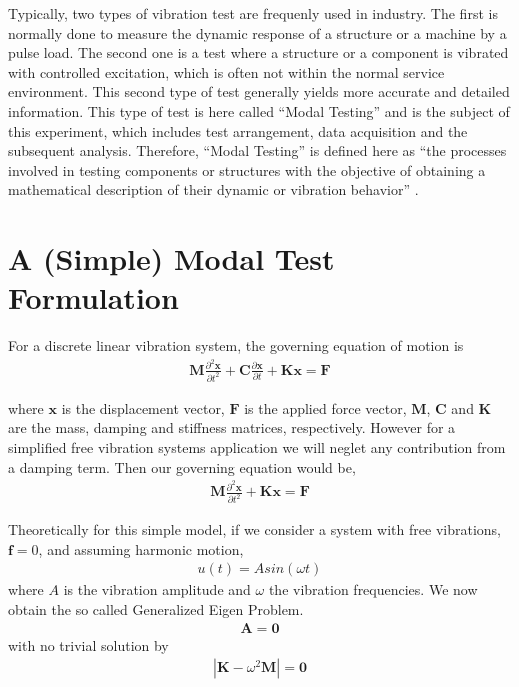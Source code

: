 \documentclass[10pt,twoside,a4paper]{article}
\renewcommand{\vec}[1]{\mathbf{#1}}
\begin{document}
Typically, two types of vibration test are frequenly used in industry. The first is normally done to measure the dynamic response of a structure or a machine by a pulse load. The second one is a test where a structure or a component is vibrated with controlled excitation, which is often not within the normal service environment. This second type of test generally yields more accurate and detailed information. This type of test is here called “Modal Testing” and is the subject of this experiment, which includes test arrangement, data acquisition and the subsequent analysis. Therefore, “Modal Testing” is defined here as “the processes involved in testing components or structures with the objective of obtaining a mathematical description of their dynamic or vibration behavior” \cite{Enboa_etal2002}.

\section{A (Simple) Modal Test Formulation}
For a discrete linear vibration system, the governing equation of motion is
\begin{align}
 \vec{M} \frac{\partial^2 \vec{x}}{\partial t^2} + \vec{C} \frac{\partial \vec{x}}{\partial t} + \vec{K} \vec{x} = \vec{F}
\label{eq:governing_equation}
\end{align}

where $\vec{x}$ is the displacement vector, $\vec{F}$ is the applied force vector, $\vec{M}$, $\vec{C}$ and $\vec{K}$ are the mass, damping and stiffness matrices, respectively. However for a simplified free vibration systems application we will neglet any contribution from a damping term. Then our governing equation would be,
\begin{align}
 \vec{M} \frac{\partial^2 \vec{x}}{\partial t^2} + \vec{K} \vec{x} = \vec{F}
\end{align}

Theoretically for this simple model, if we consider a system with free vibrations, $\vec{f}=0$, and assuming harmonic motion, 
\begin{align}
 u(t) = A sin(\omega t)
\end{align}
where $A$ is the vibration amplitude and $\omega$ the vibration frequencies. 
We now obtain the so called Generalized Eigen Problem.
\begin{align}
 [\vec{K}-\omega^2 \vec{M}]\vec{A} = \vec{0}
 \label{eq:Generalized_Eigen_Problem}
\end{align}
with no trivial solution by 
\begin{align}
 |\vec{K}-\omega^2 \vec{M}| = \vec{0}
\end{align}
\end{document}
